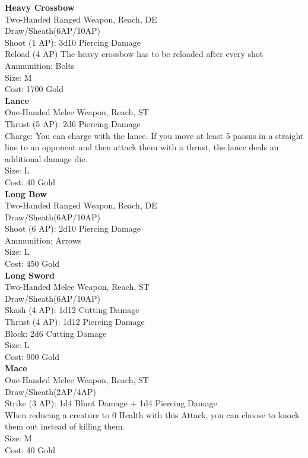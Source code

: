 \textbf{Heavy Crossbow}\label{weapon:heavyCrossbow}\\
Two-Handed Ranged Weapon,  Reach, DE\\
Draw/Sheath(6AP/10AP)\\
Shoot (1 AP): 3d10 Piercing Damage\\
Reload (4 AP) The heavy crossbow has to be reloaded after every shot\\
Ammunition: Bolts\\
Size: M\\
Cost: 1700 Gold\\

\textbf{Lance}\label{weapon:lance}\\
One-Handed Melee Weapon,  Reach, ST\\
Thrust (5 AP): 2d6 Piercing Damage\\
Charge: You can charge with the lance.
If you move at least 5 passus in a straight line to an opponent and then attack them with a thrust, the lance deals an additional damage die.\\
Size: L\\
Cost: 40 Gold\\

\textbf{Long Bow}\label{weapon:longBow}\\
Two-Handed Ranged Weapon,  Reach, DE\\
Draw/Sheath(6AP/10AP)\\
Shoot (6 AP): 2d10 Piercing Damage\\
Ammunition: Arrows\\
Size: L\\
Cost: 450 Gold\\

\textbf{Long Sword}\label{weapon:longSword}\\
Two-Handed Melee Weapon,  Reach, ST\\
Draw/Sheath(6AP/10AP)\\
Skash (4 AP): 1d12 Cutting Damage\\
Thrust (4 AP): 1d12 Piercing Damage\\
Block: 2d6 Cutting Damage\\
Size: L\\
Cost: 900 Gold\\

\textbf{Mace}\label{weapon:mace}\\
One-Handed Melee Weapon,  Reach, ST\\
Draw/Sheath(2AP/4AP)\\
Strike (3 AP): 1d4 Blunt Damage + 1d4 Piercing Damage\\
When reducing a creature to 0 Health with this Attack, you can choose to knock them out instead of killing them.\\
Size: M\\
Cost: 40 Gold\\

